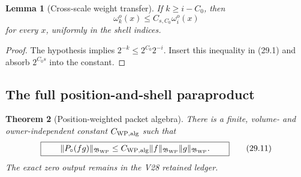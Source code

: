 \documentclass[11pt,oneside]{book}
\newtheorem{theorem}{Theorem}[chapter]
\newtheorem{lemma}[theorem]{Lemma}
\theoremstyle{definition}
\theoremstyle{remark}
\begin{document}
\begin{lemma}[Cross-scale weight transfer]
\label{lem:e8v29-cross-scale}
If \(k\geq i-C_0\), then
\[
                         \omega_k^o(x)
 \leq C_{s,C_0}\omega_i^o(x)                                    \tag{29.10}
\]
for every \(x\), uniformly in the shell indices.
\end{lemma}

\begin{proof}
The hypothesis implies \(2^{-k}\leq2^{C_0}2^{-i}\).  Insert this
inequality in (29.1) and absorb \(2^{C_0s}\) into the constant.
\end{proof}

\subsection{The full position-and-shell paraproduct}

\begin{theorem}[Position-weighted packet algebra]
\label{thm:e8v29-packet-algebra}
There is a finite, volume- and owner-independent constant
\(C_{\rm WP,alg}\) such that
\[
\boxed{\qquad
 \|P_\circ(fg)\|_{\mathfrak B_{\rm WP}}
 \leq C_{\rm WP,alg}
 \|f\|_{\mathfrak B_{\rm WP}}
 \|g\|_{\mathfrak B_{\rm WP}}.
\qquad}                                                           \tag{29.11}
\]
The exact zero output remains in the V28 retained ledger.
\end{theorem}
\end{document}
